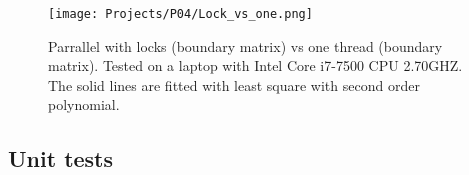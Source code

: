 \documentclass[a4paper]{article}
\begin{document}
\begin{figure}[H]
  \centering
  \texttt{[image: Projects/P04/Lock\_vs\_one.png]}
  \caption{Parrallel with locks (boundary matrix) vs one thread (boundary matrix). Tested on a laptop with Intel Core i7-7500 CPU 2.70GHZ. The solid lines are fitted with least square with second order polynomial.}
  \label{Lock_vs_one}
\end{figure}










\color{black}


















\subsection{Unit tests}
\end{document}
